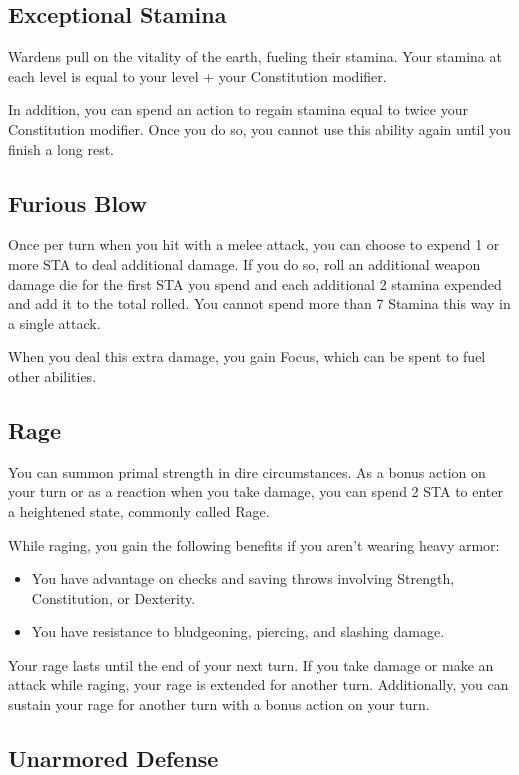 \subsection{Exceptional Stamina}
Wardens pull on the vitality of the earth, fueling their stamina. Your stamina at each level is equal to your level + your Constitution modifier.

In addition, you can spend an action to regain stamina equal to twice your Constitution modifier. Once you do so, you cannot use this ability again until you finish a long rest.

\subsection{Furious Blow}
Once per turn when you hit with a melee attack, you can choose to expend 1 or more STA to deal additional damage. If you do so, roll an additional weapon damage die for the first STA you spend and each additional 2 stamina expended and add it to the total rolled. You cannot spend more than 7 Stamina this way in a single attack.

When you deal this extra damage, you gain Focus, which can be spent to fuel other abilities.

\subsection{Rage}

You can summon primal strength in dire circumstances. As a bonus action on your turn or as a reaction when you take damage, you can spend 2 STA to enter a heightened state, commonly called Rage.

While raging, you gain the following benefits if you aren’t wearing heavy armor:

\begin{itemize}
\item You have advantage on checks and saving throws involving Strength, Constitution, or Dexterity.
\item You have resistance to bludgeoning, piercing, and slashing damage.
\end{itemize}

Your rage lasts until the end of your next turn. If you take damage or make an attack while raging, your rage is extended for another turn. Additionally, you can sustain your rage for another turn with a bonus action on your turn.

\subsection{Unarmored Defense}


